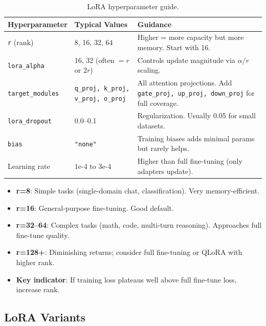 \begin{table}[ht!]
\centering
\caption{LoRA hyperparameter guide.}
\begin{tabular}{@{}lp{5cm}p{6.5cm}@{}}
\toprule
\textbf{Hyperparameter} & \textbf{Typical Values} & \textbf{Guidance} \\
\midrule
\texttt{r} (rank) & 8, 16, 32, 64 & Higher = more capacity but more memory. Start with 16. \\
\texttt{lora\_alpha} & 16, 32 (often $= r$ or $2r$) & Controls update magnitude via $\alpha/r$ scaling. \\
\texttt{target\_modules} & \texttt{q\_proj, k\_proj, v\_proj, o\_proj} & All attention projections. Add \texttt{gate\_proj, up\_proj, down\_proj} for full coverage. \\
\texttt{lora\_dropout} & 0.0--0.1 & Regularization. Usually 0.05 for small datasets. \\
\texttt{bias} & \texttt{"none"} & Training biases adds minimal params but rarely helps. \\
Learning rate & $1\text{e-}4$ to $3\text{e-}4$ & Higher than full fine-tuning (only adapters update). \\
\bottomrule
\end{tabular}
\end{table}

\begin{warningbox}
\begin{itemize}
  \item \textbf{r=8}: Simple tasks (single-domain chat, classification). Very memory-efficient.
  \item \textbf{r=16}: General-purpose fine-tuning. Good default.
  \item \textbf{r=32--64}: Complex tasks (math, code, multi-turn reasoning). Approaches full fine-tune quality.
  \item \textbf{r=128+}: Diminishing returns; consider full fine-tuning or QLoRA with higher rank.
  \item \textbf{Key indicator}: If training loss plateaus well above full fine-tune loss, increase rank.
\end{itemize}
\end{warningbox}

\subsection{LoRA Variants}
\label{lora-variants}

